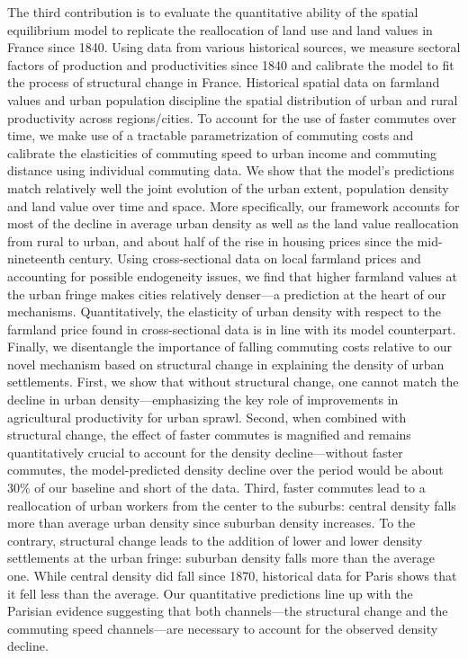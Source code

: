 \documentclass[./20250130-paper.tex]{subfiles}
\begin{document}
	
	The third contribution is to evaluate the quantitative ability of the spatial equilibrium model to replicate the reallocation of land use and land values in France since 1840. Using data from various historical sources, we measure sectoral factors of production and productivities since 1840 and calibrate the model to fit the process of structural change in France. Historical spatial data on farmland values and urban population discipline the spatial distribution of urban and rural productivity across regions/cities. To account for the use of faster commutes over time, we make use of a tractable parametrization of commuting costs and calibrate the elasticities of commuting speed to urban income and commuting distance using individual commuting data. We show that the model's predictions match relatively well the joint evolution of the urban extent, population density and land value over time and space. More specifically, our framework accounts for most of the decline in average urban density as well as the land value reallocation from rural to urban, and about half of the rise in housing prices since the mid-nineteenth century. Using cross-sectional data on local farmland prices and accounting for possible endogeneity issues, we find that higher farmland values at the urban fringe makes cities relatively denser---a prediction at the heart of our mechanisms. Quantitatively, the elasticity of urban density with respect to the farmland price found in cross-sectional data is in line with its model counterpart. Finally, we disentangle the importance of falling commuting costs relative to our novel mechanism based on structural change in explaining the density of urban settlements. First, we show that without structural change, one cannot match the decline in urban density---emphasizing the key role of improvements in agricultural productivity for urban sprawl. Second, when combined with structural change, the effect of faster commutes is magnified and remains quantitatively crucial to account for the density decline---without faster commutes, the model-predicted density decline over the period would be about 30\% of our baseline and short of the data. Third, faster commutes lead to a reallocation of urban workers from the center to the suburbs: central density falls more than average urban density since suburban density increases. To the contrary, structural change leads to the addition of lower and lower density settlements at the urban fringe: suburban density falls more than the average one. While central density did fall since 1870, historical data for Paris shows that it fell less than the average. Our quantitative predictions line up with the Parisian evidence suggesting that both channels---the structural change and the commuting speed channels---are necessary to account for the observed density decline. 
	
\end{document}
